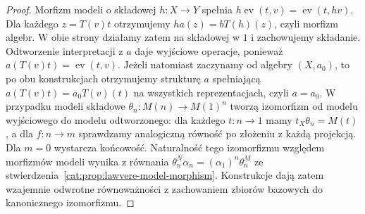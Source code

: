 \begin{proof}
Morfizm modeli o składowej $h:X\to Y$ spełnia $h\operatorname{ev}(t,v)=\operatorname{ev}(t,hv)$. Dla każdego $z=T(v)t$ otrzymujemy $ha(z)=bT(h)(z)$, czyli morfizm algebr. W obie strony działamy zatem na składowej w $1$ i zachowujemy składanie. Odtworzenie interpretacji z $a$ daje wyjściowe operacje, ponieważ $a(T(v)t)=\operatorname{ev}(t,v)$. Jeżeli natomiast zaczynamy od algebry $(X,a_0)$, to po obu konstrukcjach otrzymujemy strukturę $a$ spełniającą $a(T(v)t)=a_0T(v)(t)$ na wszystkich reprezentacjach, czyli $a=a_0$. W przypadku modeli składowe $\theta_n:M(n)\to M(1)^n$ tworzą izomorfizm od modelu wyjściowego do modelu odtworzonego: dla każdego $t:n\to1$ mamy $t_X\theta_n=M(t)$, a dla $f:n\to m$ sprawdzamy analogiczną równość po złożeniu z każdą projekcją. Dla $m=0$ wystarcza końcowość. Naturalność tego izomorfizmu względem morfizmów modeli wynika z równania $\theta_n^N\alpha_n=(\alpha_1)^n\theta_n^M$ ze stwierdzenia~\ref{cat:prop:lawvere-model-morphism}. Konstrukcje dają zatem wzajemnie odwrotne równoważności z zachowaniem zbiorów bazowych do kanonicznego izomorfizmu.
\end{proof}

